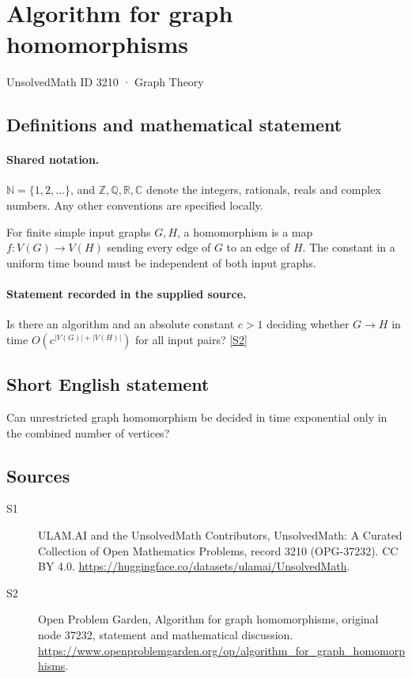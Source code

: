 \documentclass[11pt]{article}
\newcommand{\sref}[2]{\hyperlink{source:#1:#2}{[S#2]}}
\begin{document}
\setcounter{section}{3209}
\section{Algorithm for graph homomorphisms}\label{3210}
{\small\sffamily UnsolvedMath ID 3210 · Graph Theory}
\subsection{Definitions and mathematical statement}

\paragraph{Shared notation.}$\mathbb N=\{1,2,\ldots\}$, and $\mathbb Z,\mathbb Q,\mathbb R,\mathbb C$ denote the integers, rationals, reals and complex numbers. Any other conventions are specified locally.


For finite simple input graphs $G,H$, a homomorphism is a map $f:V(G)\to V(H)$ sending every edge of $G$ to an edge of $H$. The constant in a uniform time bound must be independent of both input graphs.
\paragraph{Statement recorded in the supplied source.}
Is there an algorithm and an absolute constant $c>1$ deciding whether $G\to H$ in time $O(c^{|V(G)|+|V(H)|})$ for all input pairs? \sref{3210}{2}
\subsection{Short English statement}
Can unrestricted graph homomorphism be decided in time exponential only in the combined number of vertices?
\subsection{Sources}
\begin{description}
\item[\hypertarget{source:3210:1}{S1}] ULAM.AI and the UnsolvedMath Contributors, UnsolvedMath: A Curated Collection of Open Mathematics Problems, record 3210 (OPG-37232). CC BY 4.0. \url{https://huggingface.co/datasets/ulamai/UnsolvedMath}.
\item[\hypertarget{source:3210:2}{S2}] Open Problem Garden, Algorithm for graph homomorphisms, original node 37232, statement and mathematical discussion. \url{https://www.openproblemgarden.org/op/algorithm_for_graph_homomorphisms}.
\end{description}
\label{end:3210}
\end{document}
